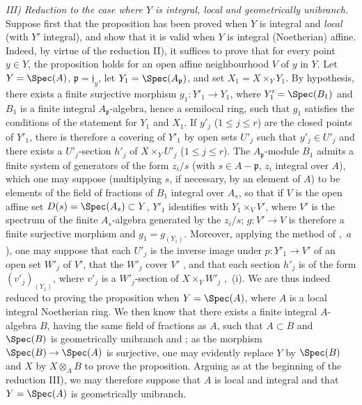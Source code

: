 \emph{III) Reduction to the case where $Y$ is integral, local and geometrically unibranch.}
Suppose first that the proposition has been proved when $Y$ is integral and \emph{local} (with $Y'$ integral), and show that it is valid when $Y$ is integral (Noetherian) affine.
Indeed, by virtue of the reduction II), it suffices to prove that for every point $y\in Y$, the proposition holds for an open affine neighbourhood $V$ of $y$ in $Y$.
Let $Y=\Spec(A)$, $\mathfrak{p}=\mathfrak{j}_y$, let $Y_1=\Spec(A_\mathfrak{p})$, and set $X_1=X\times_Y Y_1$.
By hypothesis, there exists a finite surjective morphism $g_1:Y'_1\to Y_1$, where $Y'_1=\Spec(B_1)$ and $B_1$ is a finite integral $A_\mathfrak{p}$-algebra, hence a semilocal ring, such that $g_1$ satisfies the conditions of the statement for $Y_1$ and $X_1$.
If $y'_j$ ($1\leq j\leq r$) are the closed points of $Y'_1$, there is therefore a covering of $Y'_1$ by open sets $U'_j$ such that $y'_j\in U'_j$ and there exists a $U'_j$-section $h'_j$ of $X\times_Y U'_j$ ($1\leq j\leq r$).
The $A_\mathfrak{p}$-module $B_1$ admits a finite system of generators of the form $z_i/s$ (with $s\in A-\mathfrak{p}$,
$z_i$ integral over $A$), which one may suppose (multiplying $s$, if necessary, by an element of $A$) to be elements of the field of fractions of $B_1$ integral over $A_s$, so that if $V$ is the open affine set $D(s)=\Spec(A_s)\subset Y$, $Y'_1$ identifies with $Y_1\times_V V'$, where $V'$ is the spectrum of the finite $A_s$-algebra generated by the $z_i/s$; $g:V'\to V$ is therefore a finite surjective morphism and $g_1=g_{(Y_1)}$.
Moreover, applying the method of ,~$a$), one may suppose that each $U'_j$ is the inverse image under $p:Y'_1\to V'$ of an open set $W'_j$ of $V'$, that the $W'_j$ cover $V'$ , and that each section $h'_j$ is of the form $(v'_j)_{(Y_1)}$, where $v'_j$ is a $W'_j$-section of $X\times_Y W'_j$ ,~(i).
We are thus indeed reduced to proving the proposition when $Y=\Spec(A)$, where $A$ is a local integral Noetherian ring.
We then know that there exists a finite integral $A$-algebra $B$, having the same field of fractions as $A$, such that $A\subset B$ and $\Spec(B)$ is geometrically unibranch  and ; as the morphism $\Spec(B)\to\Spec(A)$ is surjective, one may evidently replace $Y$ by $\Spec(B)$ and $X$ by $X\otimes_A B$ to prove the proposition.
Arguing as at the beginning of the reduction III), we may therefore suppose that $A$ is local and integral and that $Y=\Spec(A)$ is geometrically unibranch.

